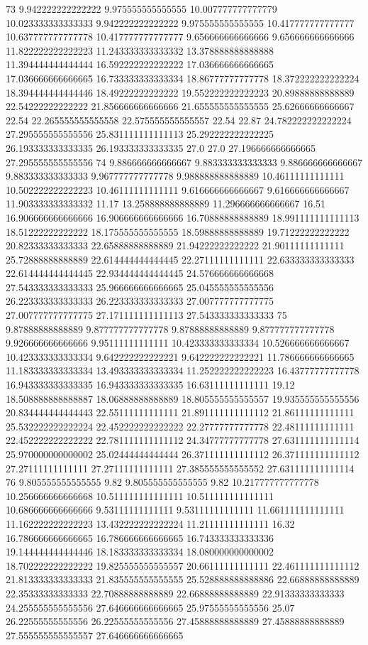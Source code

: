 73 9.942222222222222 9.975555555555555 10.007777777777779 10.023333333333333 9.942222222222222 9.975555555555555 10.417777777777777 10.637777777777778 10.417777777777777 9.656666666666666 9.656666666666666 11.822222222222223 11.243333333333332 13.378888888888888 11.394444444444444 16.592222222222222 17.036666666666665 17.036666666666665 16.733333333333334 18.86777777777778 18.372222222222224 18.394444444444446 18.49222222222222 19.552222222222223 20.89888888888889 22.54222222222222 21.856666666666666 21.655555555555555 25.62666666666667 22.54 22.265555555555558 22.575555555555557 22.54 22.87 24.782222222222224 27.295555555555556 25.831111111111113 25.292222222222225 26.193333333333335 26.193333333333335 27.0 27.0 27.196666666666665 27.295555555555556
74 9.886666666666667 9.883333333333333 9.886666666666667 9.883333333333333 9.967777777777778 9.988888888888889 10.46111111111111 10.502222222222223 10.46111111111111 9.616666666666667 9.616666666666667 11.903333333333332 11.17 13.258888888888889 11.296666666666667 16.51 16.906666666666666 16.906666666666666 16.70888888888889 18.991111111111113 18.51222222222222 18.175555555555555 18.59888888888889 19.71222222222222 20.82333333333333 22.65888888888889 21.94222222222222 21.90111111111111 25.72888888888889 22.614444444444445 22.27111111111111 22.633333333333333 22.614444444444445 22.934444444444445 24.576666666666668 27.543333333333333 25.966666666666665 25.045555555555556 26.223333333333333 26.223333333333333 27.007777777777775 27.007777777777775 27.171111111111113 27.543333333333333
75 9.87888888888889 9.877777777777778 9.87888888888889 9.877777777777778 9.926666666666666 9.95111111111111 10.423333333333334 10.526666666666667 10.423333333333334 9.642222222222221 9.642222222222221 11.786666666666665 11.183333333333334 13.493333333333334 11.252222222222223 16.43777777777778 16.943333333333335 16.943333333333335 16.63111111111111 19.12 18.508888888888887 18.06888888888889 18.805555555555557 19.935555555555556 20.834444444444443 22.55111111111111 21.891111111111112 21.86111111111111 25.532222222222224 22.452222222222222 22.27777777777778 22.48111111111111 22.452222222222222 22.781111111111112 24.34777777777778 27.631111111111114 25.970000000000002 25.02444444444444 26.371111111111112 26.371111111111112 27.27111111111111 27.27111111111111 27.385555555555552 27.631111111111114
76 9.805555555555555 9.82 9.805555555555555 9.82 10.217777777777778 10.256666666666668 10.511111111111111 10.511111111111111 10.686666666666666 9.53111111111111 9.53111111111111 11.661111111111111 11.162222222222223 13.432222222222224 11.21111111111111 16.32 16.786666666666665 16.786666666666665 16.743333333333336 19.144444444444446 18.183333333333334 18.080000000000002 18.702222222222222 19.825555555555557 20.66111111111111 22.461111111111112 21.813333333333333 21.835555555555555 25.528888888888886 22.66888888888889 22.35333333333333 22.70888888888889 22.66888888888889 22.91333333333333 24.255555555555556 27.646666666666665 25.97555555555556 25.07 26.22555555555556 26.22555555555556 27.45888888888889 27.45888888888889 27.555555555555557 27.646666666666665
